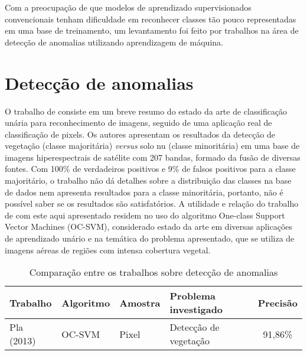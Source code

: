 Com a preocupação de que modelos de aprendizado supervisionados convencionais tenham dificuldade em reconhecer classes tão pouco representadas em uma base de treinamento, um levantamento foi feito por trabalhos na área de detecção de anomalias utilizando aprendizagem de máquina.

\section{Detecção de anomalias}\label{sec:trAnomalias}




O trabalho de  consiste em um breve resumo do estado da arte de classificação unária para reconhecimento de imagens, seguido de uma aplicação real de classificação de pixels. Os autores apresentam os resultados da detecção de vegetação (classe majoritária) \textit{versus} solo nu (classe minoritária) em uma base de imagens hiperespectrais de satélite com 207 bandas, formado da fusão de diversas fontes. Com 100\% de verdadeiros positivos e 9\% de falsos positivos para a classe majoritário, o trabalho não dá detalhes sobre a distribuição das classes na base de dados nem apresenta resultados para a classe minoritária, portanto, não é possível saber se os resultados são satisfatórios. A utilidade e relação do trabalho de  com este aqui apresentado residem no uso do algoritmo One-class Support Vector Machines (OC-SVM), considerado estado da arte em diversas aplicações de aprendizado unário e na temática do problema apresentado, que se utiliza de imagens aéreas de regiões com intensa cobertura vegetal.


\begin{table}[h]
\ABNTEXfontereduzida
\centering
\begin{tabulary}{\linewidth}{|L|L|L|L|C|}
\hline
\textbf{Trabalho} &  \textbf{Algoritmo} & \textbf{Amostra} & \textbf{Problema investigado} &  \textbf{Precisão} \\ \hline
Pla (2013) & OC-SVM & Pixel & Detecção de vegetação & 91,86\% \\ \hline
\end{tabulary}
\caption{Comparação entre os trabalhos sobre detecção de anomalias}
\label{tab:sumarioAnomalias}
\end{table}

